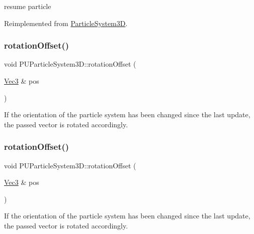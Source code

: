 resume particle 

Reimplemented from \hyperlink{classParticleSystem3D_ac5f7a2d3bd35d5243e2e90578b8daed3}{Particle\+System3D}.

\mbox{\label{classPUParticleSystem3D_ac2ff2f8940f77cc569718feabab93995}} 
\subsubsection{\texorpdfstring{rotation\+Offset()}{rotationOffset()}\hspace{0.1cm}{\footnotesize\ttfamily [1/2]}}
{\footnotesize\ttfamily void P\+U\+Particle\+System3\+D\+::rotation\+Offset (\begin{DoxyParamCaption}\item[{\hyperlink{classVec3}{Vec3} \&}]{pos }\end{DoxyParamCaption})}

If the orientation of the particle system has been changed since the last update, the passed vector is rotated accordingly. \mbox{\label{classPUParticleSystem3D_ac2ff2f8940f77cc569718feabab93995}} 
\subsubsection{\texorpdfstring{rotation\+Offset()}{rotationOffset()}\hspace{0.1cm}{\footnotesize\ttfamily [2/2]}}
{\footnotesize\ttfamily void P\+U\+Particle\+System3\+D\+::rotation\+Offset (\begin{DoxyParamCaption}\item[{\hyperlink{classVec3}{Vec3} \&}]{pos }\end{DoxyParamCaption})}

If the orientation of the particle system has been changed since the last update, the passed vector is rotated accordingly. \mbox{\label{classPUParticleSystem3D_aa3c122c37511ee36d79854cf6c488022}} 
